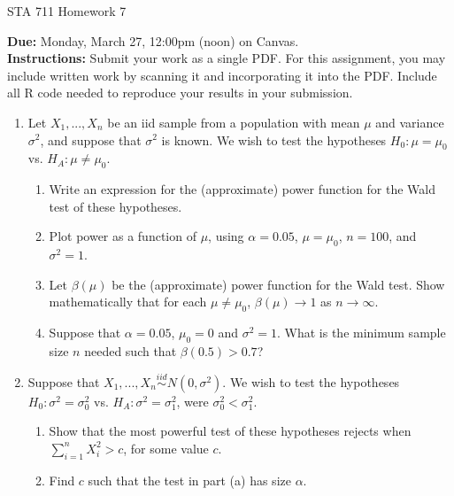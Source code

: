 \documentclass[11pt]{article}
\begin{document}
\begin{center}
\Large
STA 711 Homework 7\\
\normalsize
\vspace{5mm}
\end{center}

\noindent \textbf{Due:} Monday, March 27, 12:00pm (noon) on Canvas.\\ 

\noindent \textbf{Instructions:} Submit your work as a single PDF. For this assignment, you may include written work by scanning it and incorporating it into the PDF. Include all R code needed to reproduce your results in your submission.


\begin{enumerate}
\item Let $X_1,...,X_n$ be an iid sample from a population with mean $\mu$ and variance $\sigma^2$, and suppose that $\sigma^2$ is known. We wish to test the hypotheses $H_0: \mu = \mu_0$ vs. $H_A: \mu \neq \mu_0$.

\begin{enumerate}
\item Write an expression for the (approximate) power function for the Wald test of these hypotheses.
\item Plot power as a function of $\mu$, using $\alpha = 0.05$, $\mu = \mu_0$, $n = 100$, and $\sigma^2 = 1$.
\item Let $\beta(\mu)$ be the (approximate) power function for the Wald test. Show mathematically that for each $\mu \neq \mu_0$, $\beta(\mu) \to 1$ as $n \to \infty$.
\item Suppose that $\alpha = 0.05$, $\mu_0 = 0$ and $\sigma^2 = 1$. What is the minimum sample size $n$ needed such that $\beta(0.5) > 0.7$?
\end{enumerate}

\item Suppose that $X_1,...,X_n \overset{iid}{\sim} N(0, \sigma^2)$. We wish to test the hypotheses $H_0: \sigma^2 = \sigma_0^2$ vs. $H_A: \sigma^2 = \sigma_1^2$, were $\sigma_0^2 < \sigma_1^2$.

\begin{enumerate}
\item Show that the most powerful test of these hypotheses rejects when $\sum \limits_{i=1}^n X_i^2 > c$, for some value $c$.
\item Find $c$ such that the test in part (a) has size $\alpha$.
\end{enumerate}


\end{enumerate}
\end{document}
